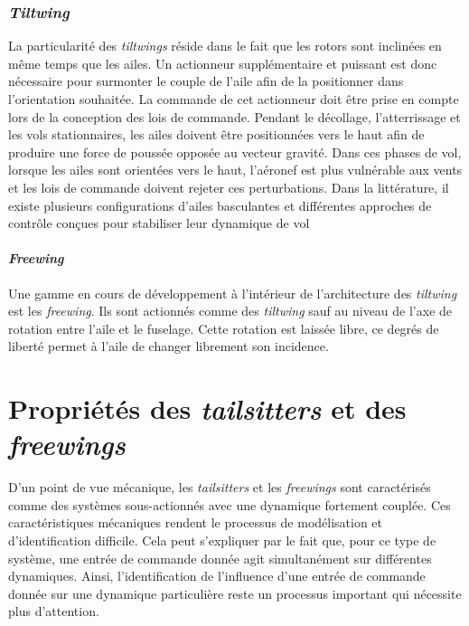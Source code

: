     
        \subsubsection*{\textit{Tiltwing}} 
        La particularité des \textit{tiltwings} réside dans le fait que les rotors sont inclinées en même temps que les ailes. Un actionneur supplémentaire et puissant est donc nécessaire pour surmonter le couple de l'aile afin de la positionner dans l'orientation souhaitée. La commande de cet actionneur doit être prise en compte lors de la conception des lois de commande. Pendant le décollage, l'atterrissage et les vols stationnaires, les ailes doivent être positionnées vers le haut afin de produire une force de poussée opposée au vecteur gravité. Dans ces phases de vol, lorsque les ailes sont orientées vers le haut, l'aéronef est plus vulnérable aux vents et les lois de commande doivent rejeter ces perturbations. Dans la littérature, il existe plusieurs configurations d'ailes basculantes et différentes approches de contrôle conçues pour stabiliser leur dynamique de vol 

        \paragraph*{\textit{Freewing}}
        Une gamme en cours de développement à l'intérieur de l'architecture des \textit{tiltwing} est les \textit{freewing}. Ils sont actionnés comme des \textit{tiltwing} sauf au niveau de l'axe de rotation entre l'aile et le fuselage. Cette rotation est laissée libre, ce degrés de liberté permet à l'aile de changer librement son incidence.

\section{Propriétés des \textit{tailsitters} et des \textit{freewings}}
    D'un point de vue mécanique, les \textit{tailsitters} et les \textit{freewings} sont caractérisés comme des systèmes sous-actionnés avec une dynamique fortement couplée. Ces caractéristiques mécaniques rendent le processus de modélisation et d'identification difficile. Cela peut s'expliquer par le fait que, pour ce type de système, une entrée de commande donnée agit simultanément sur différentes dynamiques. Ainsi, l'identification de l'influence d'une entrée de commande donnée sur une dynamique particulière reste un processus important qui nécessite plus d'attention.
